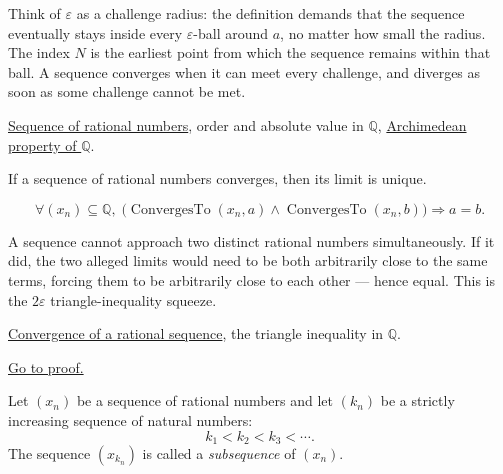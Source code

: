 \begin{remark*}[Interpretation]
Think of $\varepsilon$ as a challenge radius: the definition demands that the
sequence eventually stays inside every $\varepsilon$-ball around $a$, no
matter how small the radius.  The index $N$ is the earliest point from which
the sequence remains within that ball.  A sequence converges when it can
meet every challenge, and diverges as soon as some challenge cannot be met.
\end{remark*}

\begin{remark*}[Dependencies]
\hyperref[def:rational-sequence]{Sequence of rational numbers},
order and absolute value in $\mathbb{Q}$,
\hyperref[thm:archimedean-q]{Archimedean property of $\mathbb{Q}$}.
\end{remark*}

\begin{theorem}
\label{thm:limit-unique-q}
If a sequence of rational numbers converges, then its limit is unique.
\end{theorem}

\begin{remark*}
\[
\forall (x_n) \subseteq \mathbb{Q},\;
\bigl(
\operatorname{ConvergesTo}(x_n, a) \land \operatorname{ConvergesTo}(x_n, b)
\bigr)
\Longrightarrow a = b.
\]
\end{remark*}

\begin{remark*}[Interpretation]
A sequence cannot approach two distinct rational numbers simultaneously.
If it did, the two alleged limits would need to be both arbitrarily close to
the same terms, forcing them to be arbitrarily close to each other — hence
equal.  This is the $2\varepsilon$ triangle-inequality squeeze.
\end{remark*}

\begin{remark*}[Dependencies]
\hyperref[def:convergent-rational-sequence]{Convergence of a rational sequence},
the triangle inequality in $\mathbb{Q}$.
\end{remark*}

\begin{remark*}[Proof]
\hyperref[prf:limit-unique-q]{Go to proof.}
\end{remark*}

\begin{definition}
\label{def:subsequence-q}
Let $(x_n)$ be a sequence of rational numbers and let $(k_n)$ be a strictly
increasing sequence of natural numbers:
\[
k_1 < k_2 < k_3 < \cdots.
\]
The sequence $(x_{k_n})$ is called a \emph{subsequence} of $(x_n)$.
\end{definition}

